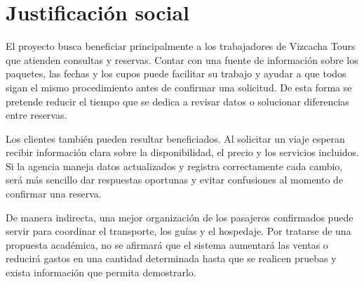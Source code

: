 \chapter{Justificación social}
\label{cap:justificacion}

El proyecto busca beneficiar principalmente a los trabajadores de Vizcacha
Tours que atienden consultas y reservas. Contar con una fuente de información
sobre los paquetes, las fechas y los cupos puede facilitar su trabajo y ayudar
a que todos sigan el mismo procedimiento antes de confirmar una solicitud. De
esta forma se pretende reducir el tiempo que se dedica a revisar datos o
solucionar diferencias entre reservas.

Los clientes también pueden resultar beneficiados. Al solicitar un viaje
esperan recibir información clara sobre la disponibilidad, el precio y los
servicios incluidos. Si la agencia maneja datos actualizados y registra
correctamente cada cambio, será más sencillo dar respuestas oportunas y
evitar confusiones al momento de confirmar una reserva.

De manera indirecta, una mejor organización de los pasajeros confirmados puede
servir para coordinar el transporte, los guías y el hospedaje. Por tratarse de
una propuesta académica, no se afirmará que el sistema aumentará las ventas o
reducirá gastos en una cantidad determinada hasta que se realicen pruebas y
exista información que permita demostrarlo.
